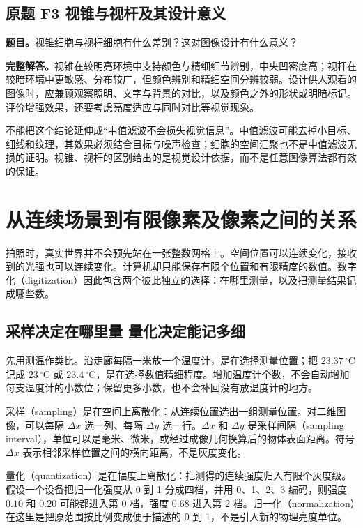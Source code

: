 \subsection*{原题 F3 视锥与视杆及其设计意义}
\label{original:F3}
\textbf{题目。}视锥细胞与视杆细胞有什么差别？这对图像设计有什么意义？

\textbf{完整解答。}视锥在较明亮环境中支持颜色与精细细节辨别，中央凹密度高；视杆在较暗环境中更敏感、分布较广，但颜色辨别和精细空间分辨较弱。设计供人观看的图像时，应兼顾观察照明、文字与背景的对比，以及颜色之外的形状或明暗标记。评价增强效果，还要考虑亮度适应与同时对比等视觉现象。

不能把这个结论延伸成“中值滤波不会损失视觉信息”。中值滤波可能去掉小目标、细线和纹理，其效果必须结合目标与噪声检查；细胞的空间汇聚也不是中值滤波无损的证明。视锥、视杆的区别给出的是视觉设计依据，而不是任意图像算法都有效的保证。

\section{从连续场景到有限像素及像素之间的关系}
\label{sec:foundations-digitization}

拍照时，真实世界并不会预先站在一张整数网格上。空间位置可以连续变化，接收到的光强也可以连续变化。计算机却只能保存有限个位置和有限精度的数值。数字化（digitization）因此包含两个彼此独立的选择：在哪里测量，以及把测量结果记成哪些数。

\subsection{采样决定在哪里量 量化决定能记多细}

先用测温作类比。沿走廊每隔一米放一个温度计，是在选择测量位置；把 $23.37\,^{\circ}\mathrm{C}$ 记成 $23\,^{\circ}\mathrm{C}$ 或 $23.4\,^{\circ}\mathrm{C}$，是在选择数值精细程度。增加温度计个数，不会自动增加每支温度计的小数位；保留更多小数，也不会补回没有放温度计的地方。

采样（sampling）是在空间上离散化：从连续位置选出一组测量位置。对二维图像，可以每隔 $\Delta x$ 选一列、每隔 $\Delta y$ 选一行。$\Delta x$ 和 $\Delta y$ 是采样间隔（sampling interval），单位可以是毫米、微米，或经过成像几何换算后的物体表面距离。符号 $\Delta x$ 表示相邻采样位置之间的横向距离，不是灰度变化。

量化（quantization）是在幅度上离散化：把测得的连续强度归入有限个灰度级。假设一个设备把归一化强度从 0 到 1 分成四档，并用 0、1、2、3 编码，则强度 $0.10$ 和 $0.20$ 可能都进入第 0 档，强度 $0.68$ 进入第 2 档。归一化（normalization）在这里是把原范围按比例变成便于描述的 0 到 1，不是引入新的物理亮度单位。

